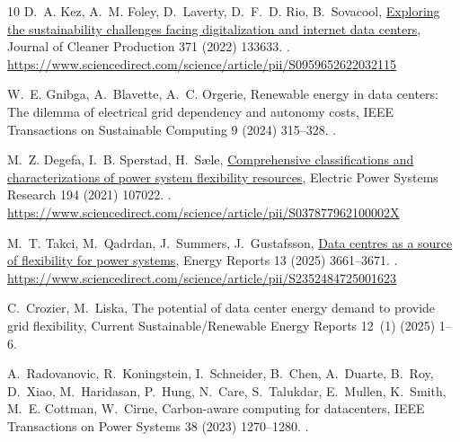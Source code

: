 \documentclass[preprint,12pt]{elsarticle}
\begin{document}
\begin{thebibliography}{10}
D.~A. Kez, A.~M. Foley, D.~Laverty, D.~F.~D. Rio, B.~Sovacool,
  \href{https://www.sciencedirect.com/science/article/pii/S0959652622032115}{Exploring
  the sustainability challenges facing digitalization and internet data
  centers}, Journal of Cleaner Production 371 (2022) 133633.
\newblock \href {https://doi.org/10.1016/J.JCLEPRO.2022.133633}
  {}.
\newline\urlprefix\url{https://www.sciencedirect.com/science/article/pii/S0959652622032115}

W.~E. Gnibga, A.~Blavette, A.~C. Orgerie, Renewable energy in data centers: The
  dilemma of electrical grid dependency and autonomy costs, IEEE Transactions
  on Sustainable Computing 9 (2024) 315--328.
\newblock \href {https://doi.org/10.1109/TSUSC.2023.3307790}
  {}.

M.~Z. Degefa, I.~B. Sperstad, H.~Sæle,
  \href{https://www.sciencedirect.com/science/article/pii/S037877962100002X}{Comprehensive
  classifications and characterizations of power system flexibility resources},
  Electric Power Systems Research 194 (2021) 107022.
\newblock \href {https://doi.org/10.1016/J.EPSR.2021.107022}
  {}.
\newline\urlprefix\url{https://www.sciencedirect.com/science/article/pii/S037877962100002X}

M.~T. Takci, M.~Qadrdan, J.~Summers, J.~Gustafsson,
  \href{https://www.sciencedirect.com/science/article/pii/S2352484725001623}{Data
  centres as a source of flexibility for power systems}, Energy Reports 13
  (2025) 3661--3671.
\newblock \href {https://doi.org/10.1016/J.EGYR.2025.03.020}
  {}.
\newline\urlprefix\url{https://www.sciencedirect.com/science/article/pii/S2352484725001623}

C.~Crozier, M.~Liska, The potential of data center energy demand to provide
  grid flexibility, Current Sustainable/Renewable Energy Reports 12~(1) (2025)
  1--6.

A.~Radovanovic, R.~Koningstein, I.~Schneider, B.~Chen, A.~Duarte, B.~Roy,
  D.~Xiao, M.~Haridasan, P.~Hung, N.~Care, S.~Talukdar, E.~Mullen, K.~Smith,
  M.~E. Cottman, W.~Cirne, Carbon-aware computing for datacenters, IEEE
  Transactions on Power Systems 38 (2023) 1270--1280.
\newblock \href {https://doi.org/10.1109/TPWRS.2022.3173250}
  {}.


\end{thebibliography}
\end{document}
